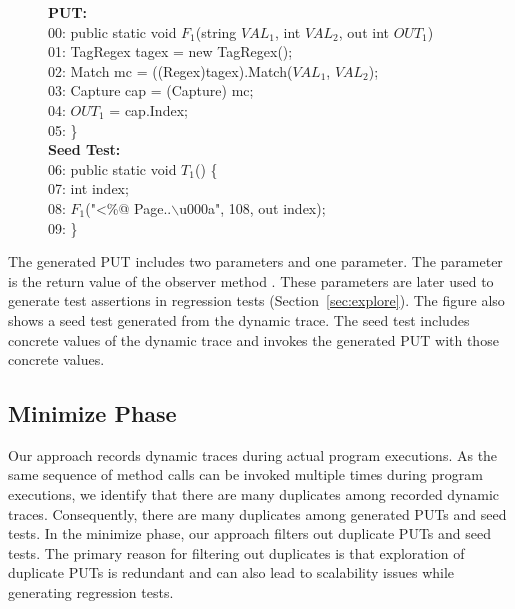 \begin{figure}[t]
\begin{CodeOut}
\textbf{PUT:}\\
00: public static void $F_1$(string $VAL_1$, int $VAL_2$, out int $OUT_1$)\\
01: \hspace*{0.2in}TagRegex tagex = new TagRegex();\\
02: \hspace*{0.2in}Match mc = ((Regex)tagex).Match($VAL_1$, $VAL_2$);\\
03: \hspace*{0.2in}Capture cap = (Capture) mc;\\
04: \hspace*{0.2in}$OUT_1$ = cap.Index;\\
05: \}\\

\textbf{Seed Test:}\\
06: public static void $T_1$() \{\\
07: \hspace*{0.2in}int index;\\
08: \hspace*{0.2in}$F_1$("<\%@ Page..$\backslash$u000a", 108, out index);\\
09: \}\\
\end{CodeOut}\vspace*{-3ex}
\vspace*{-3ex}
\end{figure}

The generated PUT includes two parameters and one  parameter.
The  parameter is the return value of the observer
method . These  parameters are later
used to generate test assertions in regression tests (Section~\ref{sec:explore}). 
The figure also shows a seed test generated from the dynamic trace. 
The seed test includes concrete values of the dynamic trace and invokes the generated PUT with those concrete values.

\subsection{Minimize Phase}
\label{sec:minimize}

Our approach records dynamic traces during actual program executions. As the same
sequence of method calls can be invoked multiple times during program executions,
we identify that there are many duplicates among recorded dynamic traces.
Consequently, there are many duplicates among generated PUTs and seed tests. 
In the minimize phase, our approach filters out duplicate PUTs and seed tests.
The primary reason for filtering out duplicates is that exploration of duplicate
PUTs is redundant and can also lead to scalability issues while generating regression tests.

